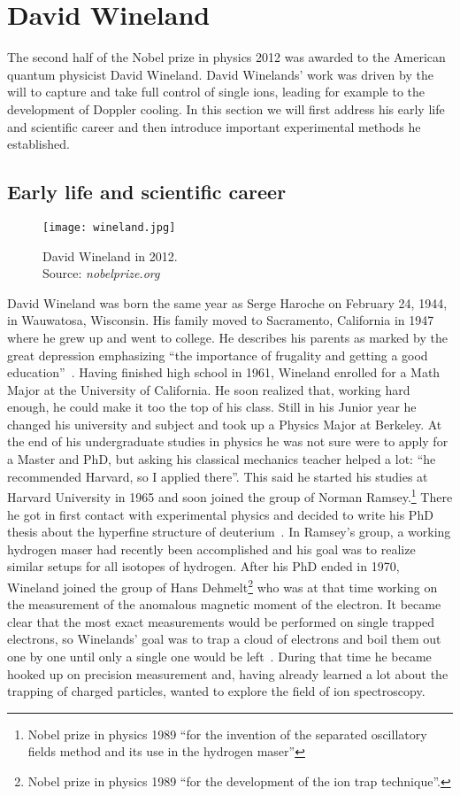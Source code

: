 \section{David Wineland}
\label{sec:Wineland}
The second half of the Nobel prize in physics 2012 was awarded to the American
quantum physicist David Wineland. David Winelands' work was driven by the will to
capture and take full control of single ions, leading for example to the
development of Doppler cooling. In this section we will first address
his early life and scientific career and then introduce important experimental
methods he established.

\subsection{Early life and scientific career}
\begin{wrapfigure}{r}{0.34\textwidth}
  \centering
  \texttt{[image: wineland.jpg]}
  \caption{David Wineland in 2012.\\ Source: \textit{nobelprize.org}}
\end{wrapfigure}
David Wineland was born the same year as Serge Haroche on February 24, 1944,
in Wauwatosa, Wisconsin. His family moved to Sacramento, California in 1947
where he grew up and went to college. He describes his parents as marked by the
great depression emphasizing ``the importance of frugality and getting a good
education''~\cite{dwbio}. Having finished high school in 1961, Wineland enrolled
for a Math Major at the University of California. He soon realized that, working
hard enough, he could make it too the top of his class. Still in his Junior year
he changed his university and subject and took up a Physics Major at Berkeley.
At the end of his undergraduate studies in physics he was not sure were to apply
for a Master and PhD, but asking his classical mechanics teacher helped a lot:
``he recommended Harvard, so I applied there''. This said he started his studies
at Harvard University in 1965 and soon joined the group of Norman Ramsey.\footnote{Nobel
prize in physics 1989 ``for the invention of the separated oscillatory fields
method and its use in the hydrogen maser''} 
There he got in first contact with experimental physics and decided to write his
PhD thesis about the hyperfine structure of deuterium~\cite{wineland1972atomic}.
In Ramsey's group, a working 
hydrogen maser had recently been accomplished and his goal was to realize similar
setups for all isotopes of hydrogen. After his PhD ended in  1970, Wineland
joined the group of Hans Dehmelt\footnote{Nobel prize in physics 1989 ``for the
development of the ion trap technique''.} who was at that time working on the
measurement of the anomalous magnetic moment of the electron. It became clear
that the most exact measurements would be performed on single trapped electrons,
so Winelands' goal was to trap a cloud of electrons and boil them out one by one
until only a single one would be left~\cite{wineland1973monoelectron}. During
that time he became hooked up on precision measurement and, having already
learned a lot about the trapping of charged particles, wanted to explore the
field of ion spectroscopy.

